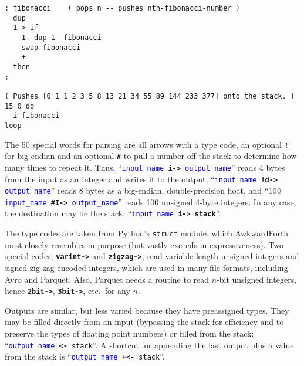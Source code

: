 \documentclass{webofc}
\begin{document}
\begin{verbatim}
: fibonacci    ( pops n -- pushes nth-fibonacci-number )
  dup
  1 > if
    1- dup 1- fibonacci
    swap fibonacci
    +
  then
;

( Pushes [0 1 1 2 3 5 8 13 21 34 55 89 144 233 377] onto the stack. )
15 0 do
  i fibonacci
loop
\end{verbatim}

The 50 special words for parsing are all arrows with a type code, an optional \textcolor{OliveGreen}{\tt\textbf{!}} for big-endian and an optional \textcolor{OliveGreen}{\tt\textbf{\#}} to pull a number off the stack to determine how many times to repeat it. Thus, ``{\tt \textcolor{blue}{input\_name} \textcolor{OliveGreen}{\textbf{i->}} \textcolor{blue}{output\_name}}'' reads 4 bytes from the input as an integer and writes it to the output, ``{\tt \textcolor{blue}{input\_name} \textcolor{OliveGreen}{\textbf{!d->}} \textcolor{blue}{output\_name}}'' reads 8 bytes as a big-endian, double-precision float, and ``{\tt \textcolor{gray}{100} \textcolor{blue}{input\_name} \textcolor{OliveGreen}{\textbf{\#I->}} \textcolor{blue}{output\_name}}'' reads 100 unsigned 4-byte integers. In any case, the destination may be the stack: ``{\tt \textcolor{blue}{input\_name} \textcolor{OliveGreen}{\textbf{i->}} \textcolor{OliveGreen}{\textbf{stack}}}''.

The type codes are taken from Python's \texttt{struct} module, which AwkwardForth most closely resembles in purpose (but vastly exceeds in expressiveness). Two special codes, \textcolor{OliveGreen}{\tt\textbf{varint->}} and \textcolor{OliveGreen}{\tt\textbf{zigzag->}}, read variable-length unsigned integers and signed zig-zag encoded integers, which are used in many file formats, including Avro and Parquet. Also, Parquet needs a routine to read $n$-bit unsigned integers, hence \textcolor{OliveGreen}{\tt\textbf{2bit->}}, \textcolor{OliveGreen}{\tt\textbf{3bit->}}, etc.\ for any $n$.

Outputs are similar, but less varied because they have preassigned types. They may be filled directly from an input (bypassing the stack for efficiency and to preserve the types of floating point numbers) or filled from the stack: ``{\tt \textcolor{blue}{output\_name} \textcolor{OliveGreen}{\textbf{<-}} \textcolor{OliveGreen}{stack}}''. A shortcut for appending the last output plus a value from the stack is ``{\tt \textcolor{blue}{output\_name} \textcolor{OliveGreen}{\textbf{+<-}} \textcolor{OliveGreen}{stack}}''.
\end{document}
